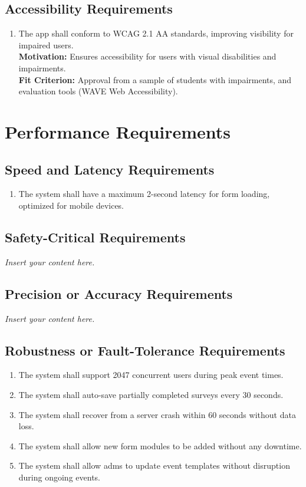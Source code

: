 \documentclass[12pt]{article}
\newcommand{\lips}{\textit{Insert your content here.}}
\begin{document}
\subsection{Accessibility Requirements}
\begin{enumerate}[label=UHR-AR.\arabic*, wide=0pt, leftmargin=*]
  \item \label{UHAR1} The app shall conform to WCAG 2.1 AA standards, improving visibility for impaired users.\\[2mm]
    {\bf Motivation:} Ensures accessibility for users with visual disabilities and impairments.\\
    {\bf Fit Criterion:} Approval from a sample of students with impairments, and evaluation tools (WAVE Web Accessibility).
\end{enumerate}

\section{Performance Requirements}
\subsection{Speed and Latency Requirements}
\begin{enumerate}[align=left,
  leftmargin=*,
  labelsep=1em,
  itemindent=0em,
  label=\bfseries SL-\arabic*:]
  \item \label{PSLR1} The system shall have a maximum 2-second latency for form loading, optimized for
    mobile devices.
\end{enumerate}
\subsection{Safety-Critical Requirements}
\lips
\subsection{Precision or Accuracy Requirements}
\lips
\subsection{Robustness or Fault-Tolerance Requirements}
\begin{enumerate}[align=left,
  leftmargin=*,
  labelsep=1em,
  itemindent=0em,
  label=\bfseries RF-\arabic*:]
  \item \label{PTFR1} The system shall support 2047 concurrent users during peak event times.
  \item \label{PTFR2} The system shall auto-save partially completed surveys every 30 seconds.
  \item \label{PTFR3} The system shall recover from a server crash within 60 seconds without data loss.
  \item \label{PTFR4} The system shall allow new form modules to be added without any downtime.
  \item \label{PTFR5} The system shall allow \glspl{adm} to update event templates without disruption
    during ongoing events.
\end{enumerate}
\end{document}
